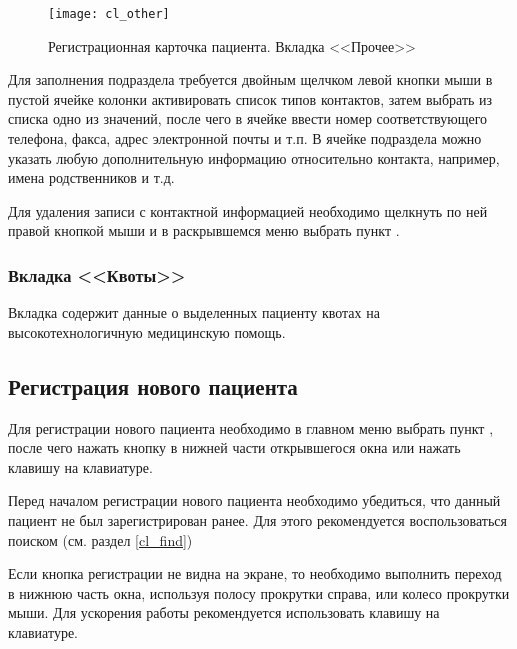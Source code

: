 \begin{figure}[ht]\centering
 \texttt{[image: cl\_other]}
 \caption{Регистрационная карточка пациента. Вкладка <<Прочее>>}
 \label{img_cl_other}
\end{figure} 

Для заполнения подраздела  требуется двойным щелчком левой кнопки мыши в пустой ячейке колонки  активировать список типов контактов, затем выбрать из списка одно из значений, после чего в ячейке  ввести номер соответствующего телефона, факса, адрес электронной почты и т.п. В ячейке  подраздела  можно указать любую дополнительную информацию относительно контакта, например, имена родственников и т.д.

Для удаления записи с контактной информацией необходимо щелкнуть по ней правой кнопкой мыши и в раскрывшемся меню выбрать пункт .

\subsubsection{Вкладка <<Квоты>>}

Вкладка содержит данные о выделенных пациенту квотах на высокотехнологичную медицинскую помощь. 

\subsection{Регистрация нового пациента} \label{cl_new}

Для регистрации нового пациента необходимо в главном меню выбрать пункт , после чего нажать кнопку   в нижней части открывшегося окна или нажать клавишу  на клавиатуре.

\begin{vnim}
Перед началом регистрации нового пациента необходимо убедиться, что данный пациент не был зарегистрирован ранее. Для этого рекомендуется воспользоваться поиском (см. раздел \ref{cl_find})
\end{vnim}

\begin{vnim}
Если кнопка регистрации не видна на экране, то необходимо выполнить переход в нижнюю часть окна, используя полосу прокрутки справа, или колесо прокрутки мыши. Для ускорения работы рекомендуется использовать клавишу  на клавиатуре.
\end{vnim}
 
